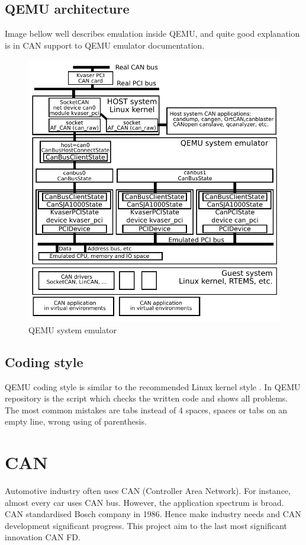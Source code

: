 \documentclass{ctuthesis}
\begin{document}
 \section{QEMU architecture}
 Image bellow well describes emulation inside QEMU, and quite good explanation is in CAN support to QEMU emulator documentation. \cite[page 2-4]{qemu-mainline}
 \begin{figure}[H]
 \includegraphics[width=1\textwidth]{qemu-can-bus}
 \caption{QEMU system emulator \cite{qemu-canbusexplain}}
 \end{figure}
 \section{Coding style}
 QEMU coding style \cite{qemu-style} is similar to the recommended Linux kernel style \cite{linux-style}. In QEMU repository is the script which checks the written code and shows all problems. The most common mistakes are tabs instead of 4 spaces, spaces or tabs on an empty line, wrong using of parenthesis.
 
 
\chapter{CAN}
Automotive industry often uses CAN (Controller Area Network).  For instance, almost every car uses CAN bus. However, the application spectrum is broad. CAN standardised Bosch company in 1986. Hence make industry needs and CAN development significant progress. This project aim to the last most significant innovation CAN FD.
\end{document}
